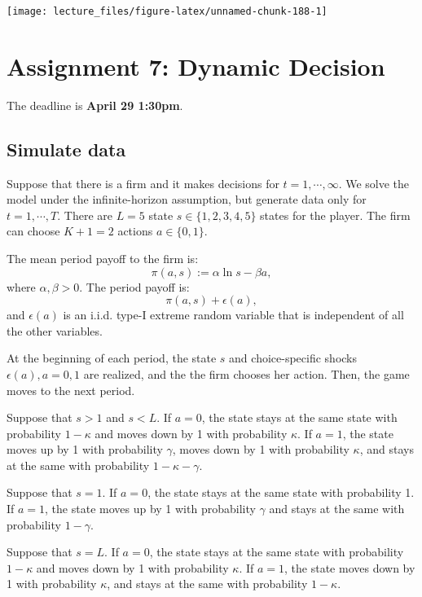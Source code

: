 \documentclass[]{book}
\begin{document}
\begin{center}\texttt{[image: lecture\_files/figure-latex/unnamed-chunk-188-1]} \end{center}

\chapter{Assignment 7: Dynamic Decision}\label{assignment7}

The deadline is \textbf{April 29 1:30pm}.

\section{Simulate data}\label{simulate-data-6}

Suppose that there is a firm and it makes decisions for
\(t = 1, \cdots, \infty\). We solve the model under the infinite-horizon
assumption, but generate data only for \(t = 1, \cdots, T\). There are
\(L = 5\) state \(s \in \{1, 2, 3, 4, 5\}\) states for the player. The
firm can choose \(K + 1 = 2\) actions \(a \in \{0, 1\}\).

The mean period payoff to the firm is: \[
\pi(a, s) :=  \alpha \ln s - \beta a,
\] where \(\alpha, \beta > 0\). The period payoff is: \[
\pi(a, s) + \epsilon(a),
\] and \(\epsilon(a)\) is an i.i.d. type-I extreme random variable that
is independent of all the other variables.

At the beginning of each period, the state \(s\) and choice-specific
shocks \(\epsilon(a), a = 0, 1\) are realized, and the the firm chooses
her action. Then, the game moves to the next period.

Suppose that \(s > 1\) and \(s < L\). If \(a = 0\), the state stays at
the same state with probability \(1 - \kappa\) and moves down by 1 with
probability \(\kappa\). If \(a = 1\), the state moves up by 1 with
probability \(\gamma\), moves down by 1 with probability \(\kappa\), and
stays at the same with probability \(1 - \kappa - \gamma\).

Suppose that \(s = 1\). If \(a = 0\), the state stays at the same state
with probability 1. If \(a = 1\), the state moves up by 1 with
probability \(\gamma\) and stays at the same with probability
\(1 - \gamma\).

Suppose that \(s = L\). If \(a = 0\), the state stays at the same state
with probability \(1 - \kappa\) and moves down by 1 with probability
\(\kappa\). If \(a = 1\), the state moves down by 1 with probability
\(\kappa\), and stays at the same with probability \(1 - \kappa\).
\end{document}
